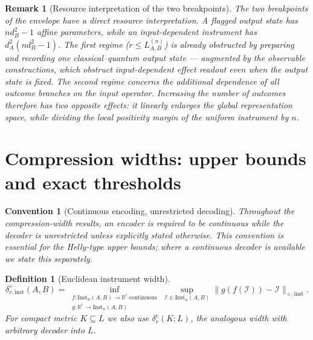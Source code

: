 \documentclass[11pt,a4paper]{article}
\newtheorem{definition}[theorem]{Definition}
\newtheorem{remark}[theorem]{Remark}
\newtheorem{convention}[theorem]{Convention}
\newcommand{\Inst}{\mathrm{Inst}}
\begin{document}
\begin{remark}[Resource interpretation of the two breakpoints]
\label{rem:breakpoints}
The two breakpoints of the envelope have a direct resource interpretation. A flagged output state has $nd_B^2-1$ affine parameters, while an input-dependent instrument has $d_A^2(nd_B^2-1)$. The first regime ($r\le L_{A,B}^{(n)}$) is already obstructed by preparing and recording one classical--quantum output state --- augmented by the observable constructions, which obstruct input-dependent effect readout even when the output state is fixed. The second regime concerns the additional dependence of all outcome branches on the input operator. Increasing the number of outcomes therefore has two opposite effects: it linearly enlarges the global representation space, while dividing the local positivity margin of the uniform instrument by $n$.
\end{remark}

\section{Compression widths: upper bounds and exact thresholds}
\label{sec:widths}

\begin{convention}[Continuous encoding, unrestricted decoding]
\label{conv:decoder}
Throughout the compression-width results, an encoder is required to be continuous while the decoder is unrestricted unless explicitly stated otherwise. This convention is essential for the Helly-type upper bounds; where a continuous decoder is available we state this separately.
\end{convention}

\begin{definition}[Euclidean instrument width]
\label{def:width}
\[
\delta_{r,\mathrm{inst}}^{\diamond}(A,B)
=\inf_{\substack{f:\Inst_n(A,B)\to\mathbb R^r\ \text{continuous}\\ g:\mathbb R^r\to\Inst_n(A,B)}}
\sup_{\mathcal I\in\Inst_n(A,B)}
\|g(f(\mathcal I))-\mathcal I\|_{\diamond,\mathrm{inst}}.
\]
For compact metric $K\subseteq L$ we also use $\delta_r^{\mathrm c}(K;L)$, the analogous width with arbitrary decoder into $L$.
\end{definition}
\end{document}
